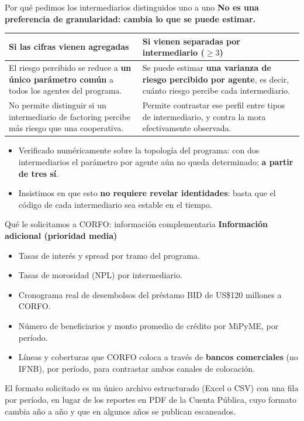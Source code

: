 \documentclass[aspectratio=169]{beamer}
\begin{document}
\begin{frame}{Por qué pedimos los intermediarios distinguidos uno a uno}
\textbf{No es una preferencia de granularidad: cambia lo que se puede estimar.}

\vspace{0.3cm}
\begin{table}
\centering
\small
\begin{tabular}{@{}p{6.2cm}p{6.2cm}@{}}
\toprule
\textbf{Si las cifras vienen agregadas} & \textbf{Si vienen separadas por intermediario ($\geq 3$)} \\
\midrule
El riesgo percibido se reduce a \textbf{un único parámetro común} a todos los agentes del programa. & Se puede estimar \textbf{una varianza de riesgo percibido por agente}, es decir, cuánto riesgo percibe cada intermediario. \\
\addlinespace
No permite distinguir si un intermediario de factoring percibe más riesgo que una cooperativa. & Permite contrastar ese perfil entre tipos de intermediario, y contra la mora efectivamente observada. \\
\bottomrule
\end{tabular}
\end{table}

\vspace{0.3cm}
\begin{itemize}\small
    \item Verificado numéricamente sobre la topología del programa: con dos intermediarios el parámetro por agente aún no queda determinado; \textbf{a partir de tres sí}.
    \item Insistimos en que esto \textbf{no requiere revelar identidades}: basta que el código de cada intermediario sea estable en el tiempo.
\end{itemize}
\end{frame}

\begin{frame}{Qué le solicitamos a CORFO: información complementaria}
\textbf{Información adicional (prioridad media)}
\begin{itemize}
    \item Tasas de interés y spread por tramo del programa.
    \item Tasas de morosidad (NPL) por intermediario.
    \item Cronograma real de desembolsos del préstamo BID de US\$120 millones a CORFO.
    \item Número de beneficiarios y monto promedio de crédito por MiPyME, por período.
    \item Líneas y coberturas que CORFO coloca a través de \textbf{bancos comerciales} (no IFNB), por período, para contrastar ambos canales de colocación.
\end{itemize}

\vspace{0.3cm}
\footnotesize{El formato solicitado es un único archivo estructurado (Excel o CSV) con una fila por período, en lugar de los reportes en PDF de la Cuenta Pública, cuyo formato cambia año a año y que en algunos años se publican escaneados.}
\end{frame}
\end{document}

